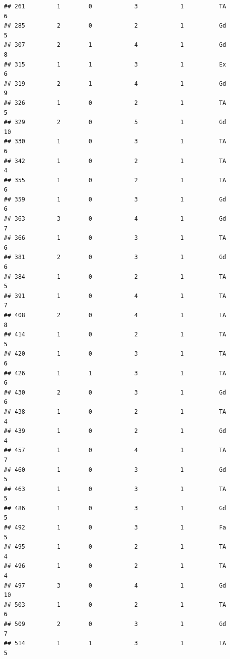 \documentclass[]{article}
\begin{document}
\begin{verbatim}
## 261         1        0            3            1          TA            6
## 285         2        0            2            1          Gd            5
## 307         2        1            4            1          Gd            8
## 315         1        1            3            1          Ex            6
## 319         2        1            4            1          Gd            9
## 326         1        0            2            1          TA            5
## 329         2        0            5            1          Gd           10
## 330         1        0            3            1          TA            6
## 342         1        0            2            1          TA            4
## 355         1        0            2            1          TA            6
## 359         1        0            3            1          Gd            6
## 363         3        0            4            1          Gd            7
## 366         1        0            3            1          TA            6
## 381         2        0            3            1          Gd            6
## 384         1        0            2            1          TA            5
## 391         1        0            4            1          TA            7
## 408         2        0            4            1          TA            8
## 414         1        0            2            1          TA            5
## 420         1        0            3            1          TA            6
## 426         1        1            3            1          TA            6
## 430         2        0            3            1          Gd            6
## 438         1        0            2            1          TA            4
## 439         1        0            2            1          Gd            4
## 457         1        0            4            1          TA            7
## 460         1        0            3            1          Gd            5
## 463         1        0            3            1          TA            5
## 486         1        0            3            1          Gd            5
## 492         1        0            3            1          Fa            5
## 495         1        0            2            1          TA            4
## 496         1        0            2            1          TA            4
## 497         3        0            4            1          Gd           10
## 503         1        0            2            1          TA            6
## 509         2        0            3            1          Gd            7
## 514         1        1            3            1          TA            5

\end{verbatim}
\end{document}
